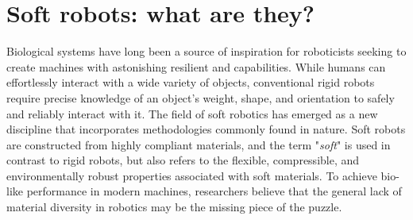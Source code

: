 \section{Soft robots: what are they?}
\label{sec:intro:history}
Biological systems have long been a source of inspiration for roboticists seeking to create machines with astonishing resilient and capabilities. While humans can effortlessly interact with a wide variety of objects, conventional rigid robots require precise knowledge of an object's weight, shape, and orientation to safely and reliably interact with it. The field of soft robotics has emerged as a new discipline that incorporates methodologies commonly found in nature. Soft robots are constructed from highly compliant materials, and the term "\emph{soft}" is used in contrast to rigid robots, but also refers to the flexible, compressible, and environmentally robust properties associated with soft materials. To achieve bio-like performance in modern machines, researchers believe that the general lack of material diversity in robotics may be the missing piece of the puzzle.

